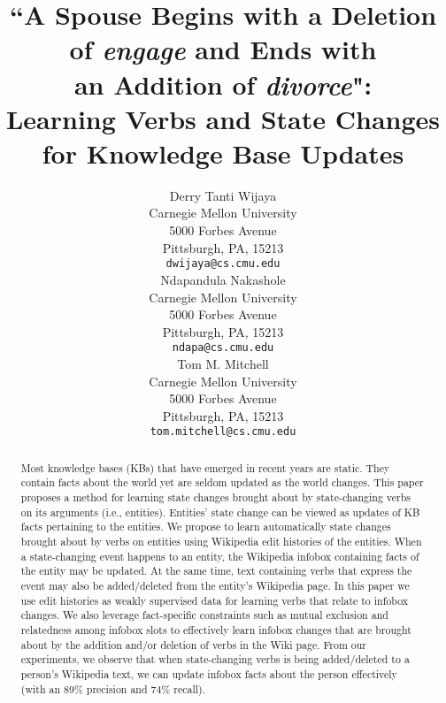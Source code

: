 \documentclass[11pt,a4paper]{article}
\title{``A Spouse Begins with a Deletion of \textit{engage} and Ends with \\an Addition of \textit{divorce}": \\Learning Verbs and State Changes for Knowledge Base Updates}
\author{Derry Tanti Wijaya \\
  Carnegie Mellon University \\
  5000 Forbes Avenue \\
  Pittsburgh, PA, 15213 \\
  {\tt dwijaya@cs.cmu.edu} \\\And
   Ndapandula Nakashole \\
  Carnegie Mellon University \\
  5000 Forbes Avenue \\
  Pittsburgh, PA, 15213 \\
  {\tt ndapa@cs.cmu.edu} \\\And
  Tom M. Mitchell \\
  Carnegie Mellon University \\
  5000 Forbes Avenue \\
  Pittsburgh, PA, 15213 \\
  {\tt tom.mitchell@cs.cmu.edu} \\}
\date{}
\begin{document}
\maketitle


\begin{abstract}
Most knowledge bases (KBs) that have emerged in recent years are static. They contain facts about the world yet are seldom updated as the world changes. This paper proposes a method for learning state changes brought about by state-changing verbs on its arguments (i.e., entities). Entities' state change can be viewed as updates of KB facts pertaining to the entities. We propose to learn automatically state changes brought about by verbs on entities using Wikipedia edit histories of the entities. When a state-changing event happens to an entity, the Wikipedia infobox containing facts of the entity may be updated. At the same time, text containing verbs that express the event may also be added/deleted from the entity's Wikipedia page. In this paper we use edit histories as weakly supervised data for learning verbs that relate to infobox changes. We also leverage fact-specific constraints such as mutual exclusion and relatedness among infobox slots to effectively learn infobox changes that are brought about by the addition and/or deletion of verbs in the Wiki page. From our experiments, we observe that when state-changing verbs is being added/deleted to a person's Wikipedia text, we can update infobox facts about the person effectively (with an 89\% precision and 74\% recall). 

\end{abstract}








\end{document}
